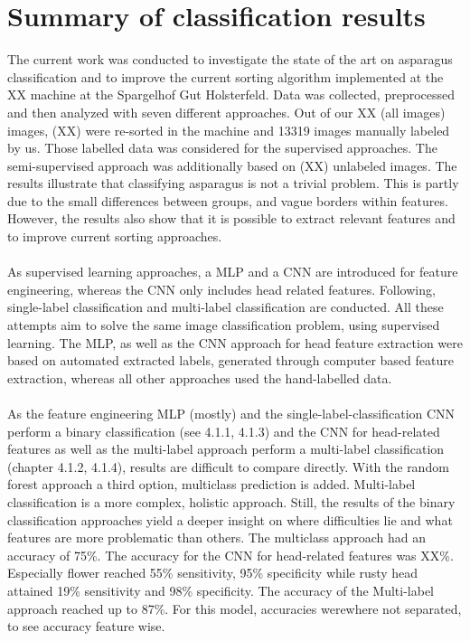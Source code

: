 \section{Summary of classification results}

The current work was conducted to investigate the state of the art on asparagus classification and to improve the current sorting algorithm implemented at the XX machine at the Spargelhof Gut Holsterfeld. Data was collected, preprocessed and then analyzed with seven different approaches. Out of our XX (all images) images, (XX) were re-sorted in the machine and 13319 images manually labeled by us. Those labelled data was considered for the supervised approaches. The semi-supervised approach was additionally based on (XX) unlabeled images. The results illustrate that classifying asparagus is not a trivial problem. This is partly due to the small differences between groups, and vague borders within features. However, the results also show that it is possible to extract relevant features and to improve current sorting approaches. \\
\\
As supervised learning approaches, a MLP and a CNN are introduced for feature engineering, whereas the CNN only includes head related features. Following, single-label classification and multi-label classification are conducted. All these attempts aim to solve the same image classification problem, using supervised learning.
The MLP, as well as the CNN approach for head feature extraction were based on automated extracted labels, generated through computer based feature extraction, whereas all other approaches used the hand-labelled data. \\
\\
As the feature engineering MLP (mostly) and the single-label-classification CNN perform a binary classification (see 4.1.1, 4.1.3) and the CNN for head-related features as well as the multi-label approach perform a multi-label classification (chapter 4.1.2, 4.1.4), results are difficult to compare directly. With the random forest approach a third option, multiclass prediction is added. Multi-label classification is a more complex, holistic approach. Still, the results of the binary classification approaches yield a deeper insight on where difficulties lie and what features are more problematic than others.
The multiclass approach had an accuracy of 75\%. The accuracy for the CNN for head-related features was XX\%. Especially flower reached 55\% sensitivity, 95\% specificity while rusty head attained 19\% sensitivity and 98\% specificity. The accuracy of the Multi-label approach reached up to 87\%. For this model, accuracies werewhere not separated, to see accuracy feature wise. \\
